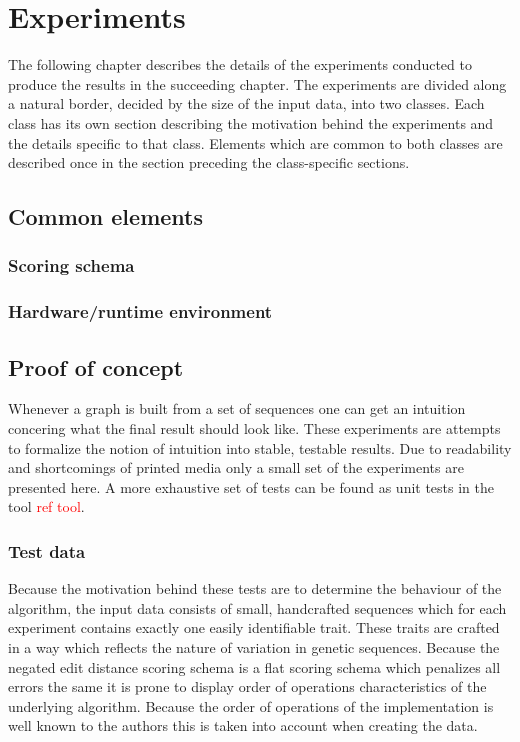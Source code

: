 \documentclass[thesis.tex]{subfiles}
\begin{document}
\chapter{Experiments}
The following chapter describes the details of the experiments conducted to produce the results in the succeeding chapter. The experiments are divided along a natural border, decided by the size of the input data, into two classes. Each class has its own section describing the motivation behind the experiments and the details specific to that class. Elements which are common to both classes are described once in the section preceding the class-specific sections.
\section{Common elements}
\subsection{Scoring schema}
\subsection{Hardware/runtime environment}
\section{Proof of concept}
Whenever a graph is built from a set of sequences one can get an intuition concering what the final result should look like. These experiments are attempts to formalize the notion of intuition into stable, testable results. Due to readability and shortcomings of printed media only a small set of the experiments are presented here. A more exhaustive set of tests can be found as unit tests in the tool \textcolor{red}{ref tool}.
\subsection{Test data}
Because the motivation behind these tests are to determine the behaviour of the algorithm, the input data consists of small, handcrafted sequences which for each experiment contains exactly one easily identifiable trait. These traits are crafted in a way which reflects the nature of variation in genetic sequences. Because the negated edit distance scoring schema is a flat scoring schema which penalizes all errors the same it is prone to display order of operations characteristics of the underlying algorithm. Because the order of operations of the implementation is well known to the authors this is taken into account when creating the data.
\end{document}
